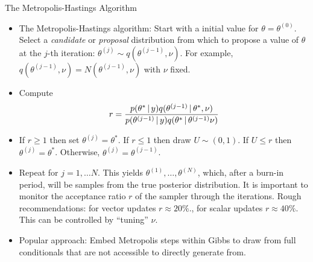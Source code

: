 {\footnotesize
\begin{frame}{The Metropolis-Hastings Algorithm}

 \begin{itemize}\setlength{\itemsep}{0.cm}
  \item The Metropolis-Hastings algorithm: Start with a initial value for $\theta=\theta^{(0)}$. Select a \emph{candidate} or \emph{proposal} distribution from which to propose a value of $\theta$ at the $j$-th iteration: $\theta^{(j)} \sim q(\theta^{(j-1)}, \nu)$. For example, $q(\theta^{(j-1)},\nu)=N(\theta^{(j-1)},\nu)$ with $\nu$ fixed.

\item Compute
\[
r =
\frac{p(\theta^{\ast}\,|\, y)q(\theta^{(j-1)}\,|\,\theta^{\ast},\nu)}{p(\theta^{(j-1)}\,|\, y)q(\theta^{\ast}\,|\,\theta^{(j-1)}\nu)}
\]

\item If $r \geq 1$ then set $\theta^{(j)}=\theta^{\ast}$. If $r \leq 1$ then draw $U\sim(0,1)$. If $U \leq r$ then
$\theta^{(j)}=\theta^{\ast}$. Otherwise, $\theta^{(j)}=\theta^{(j-1)}$.

\item Repeat for $j=1,\ldots N$. This yields $\theta^{(1)},\ldots,\theta^{(N)}$, which, after a burn-in period, will be samples from the true posterior distribution. It is important to monitor the acceptance ratio $r$ of the sampler through the iterations. Rough recommendations: for vector updates $r\approx 20\%$., for scalar updates $r\approx 40\%$. This can be controlled by ``tuning'' $\nu$.

\item Popular approach: Embed Metropolis steps within Gibbs to draw from full conditionals that are not accessible to directly generate from. 

\end{itemize}

\end{frame}
}

